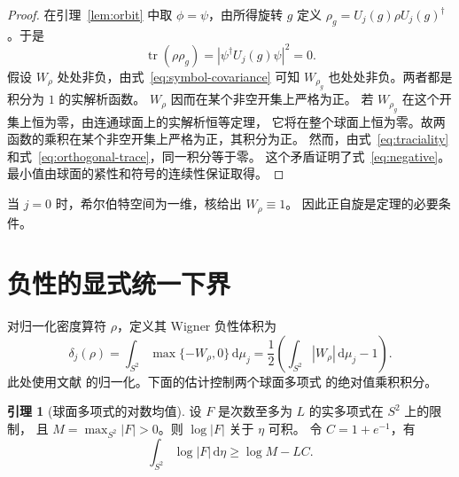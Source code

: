 \documentclass[UTF8,11pt,a4paper]{ctexart}
\theoremstyle{definition}
\newtheorem{lemma}{引理}
\DeclareMathOperator{\tr}{tr}
\newcommand{\dd}{\,\mathrm{d}}
\begin{document}
\begin{proof}
在引理~\ref{lem:orbit} 中取 \(\phi=\psi\)，由所得旋转 \(g\) 定义
\(\rho_g=U_j(g)\rho U_j(g)^\dagger\)。于是
\begin{equation}
  \tr(\rho\rho_g)=|\psi^\dagger U_j(g)\psi|^2=0 .
  \label{eq:orthogonal-trace}
\end{equation}
假设 \(W_\rho\) 处处非负，由式~\eqref{eq:symbol-covariance} 可知
\(W_{\rho_g}\) 也处处非负。两者都是积分为 \(1\) 的实解析函数。
\(W_\rho\) 因而在某个非空开集上严格为正。
若 \(W_{\rho_g}\) 在这个开集上恒为零，由连通球面上的实解析恒等定理，
它将在整个球面上恒为零。故两函数的乘积在某个非空开集上严格为正，其积分为正。
然而，由式~\eqref{eq:traciality} 和式~\eqref{eq:orthogonal-trace}，同一积分等于零。
这个矛盾证明了式~\eqref{eq:negative}。最小值由球面的紧性和符号的连续性保证取得。
\end{proof}

当 \(j=0\) 时，希尔伯特空间为一维，核给出 \(W_\rho\equiv1\)。
因此正自旋是定理的必要条件。

\section{负性的显式统一下界}

对归一化密度算符 \(\rho\)，定义其 Wigner 负性体积为
\begin{equation}
  \delta_j(\rho)
  =\int_{S^2}\max\{-W_\rho,0\}\dd\mu_j
  =\frac12\left(\int_{S^2}|W_\rho|\dd\mu_j-1\right).
  \label{eq:negative-volume}
\end{equation}
此处使用文献 \cite[式 (14)]{davis2021} 的归一化。下面的估计控制两个球面多项式
的绝对值乘积积分。

\begin{lemma}[球面多项式的对数均值]\label{lem:log}
设 \(F\) 是次数至多为 \(L\) 的实多项式在 \(S^2\) 上的限制，
且 \(M=\max_{S^2}|F|>0\)。则 \(\log|F|\) 关于 \(\eta\) 可积。
令 \(C=1+e^{-1}\)，有
\begin{equation}
  \int_{S^2}\log|F|\dd\eta\geq \log M-LC .
  \label{eq:logmean}
\end{equation}
\end{lemma}
\end{document}
